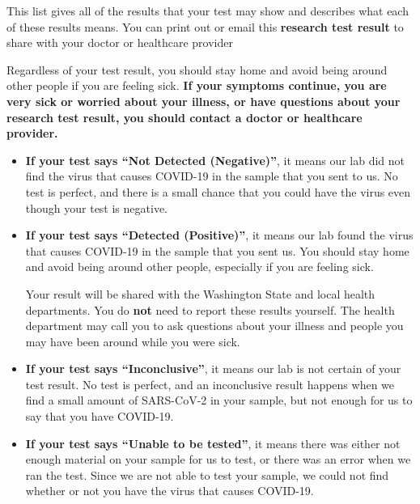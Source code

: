 \documentclass[10pt]{article}
\begin{document}
This list gives all of the results that your test may show and describes what
each of these results means. You can print out or email this \textbf{research
test result} to share with your doctor or healthcare provider

Regardless of your test result, you should stay home and avoid being around
other people if you are feeling sick. \textbf{If your symptoms continue, you are
very sick or worried about your illness, or have questions about your research
test result, you should contact a doctor or healthcare provider.}

\begin{itemize}


\item

  \textbf{If your test says ``Not Detected (Negative)''}, it means our lab did not find the
  virus that causes COVID-19 in the sample that you sent to us. No test is
  perfect, and there is a small chance that you could have the virus even though
  your test is negative.

\item

  \textbf{If your test says ``Detected (Positive)''}, it means our
  lab found the virus that causes COVID-19 in the sample that you sent us. You
  should stay home and avoid being around other people, especially if you are
  feeling sick.

  Your result will be shared with the Washington State and local health
  departments. You do \textbf{not} need to report these results yourself. The
  health department may call you to ask questions about your illness and people
  you may have been around while you were sick.

\item

  \textbf{If your test says ``Inconclusive''}, it means our lab is not certain
  of your test result. No test is perfect, and an inconclusive result happens
  when we find a small amount of SARS-CoV-2 in your sample, but not enough for
  us to say that you have COVID-19.

\item

  \textbf{If your test says ``Unable to be tested''}, it means there was either
  not enough material on your sample for us to test, or there was an error when
  we ran the test. Since we are not able to test your sample, we could not find
  whether or not you have the virus that causes COVID-19.

\end{itemize}
\end{document}
